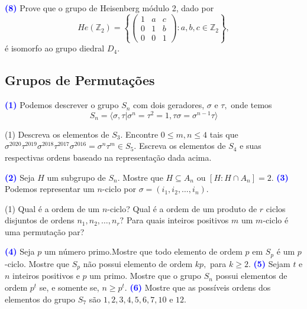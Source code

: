 \documentclass[12pt, a4paper]{article}
\newcommand{\negrito}[1]{\mbox{\boldmath{$#1$}}}
\begin{document}
\textcolor{blue}{\bf(8)} \label{ex5} Prove que o grupo de Heisenberg módulo 2, dado por
\[He(\mathbb{Z}_2) = \left\{ \left( \begin{array}{ccc} 1 & a & c \\ 0 & 1 & b \\ 0 & 0 & 1 \end{array} \right) : a,b,c \in \mathbb{Z}_2 \right\},\]
é isomorfo ao grupo diedral $D_4.$
\newpage
\subsection{\textcolor{Floresta}{Grupos de Permutações}}
\textcolor{blue}{\bf(1)}\label{64} Podemos descrever o grupo $S_n$ com dois geradores, $\sigma$ e $\tau,$ onde temos
\[
S_n = \langle \sigma, \tau |\sigma^n = \tau^2 = 1, \tau \sigma  = \sigma^{n-1} \tau \rangle
\]
\begin{tasks}[counter-format={(tsk[a])},label-width=3.6ex, label-format = {\bfseries}, column-sep = {0pt}](1)
\task[\textcolor{Floresta}{$\negrito{(a)} $}] Descreva os elementos de $S_3.$
\task[\textcolor{Floresta}{$\negrito{(b)} $}] Encontre $0 \le m, n \le 4$ tais que $\sigma^{2020}\tau^{2019}\sigma^{2018}\tau^{2017}\sigma^{2016} = \sigma^n \tau^m \in S_5.$
\task[\textcolor{Floresta}{$\negrito{(c)} $}] Escreva os elementos de $S_4$ e suas respectivas ordens baseado na representação dada acima.
\end{tasks}
\textcolor{blue}{\bf(2)}\label{65} Seja $H$ um subgrupo de $S_n.$ Mostre que $H \subseteq A_n$ ou $[H : H \cap A_n] = 2.$
\newline\newline
\textcolor{blue}{\bf(3)}\label{66} Podemos representar um $n$-ciclo por $\sigma = (i_1, i_2, \ldots, i_n).$
\begin{tasks}[counter-format={(tsk[a])},label-width=3.6ex, label-format = {\bfseries}, column-sep = {0pt}](1)
\task[\textcolor{Floresta}{$\negrito{(a)} $}] Qual é a ordem de um $n$-ciclo?
\task[\textcolor{Floresta}{$\negrito{(b)} $}] Qual é a ordem de um produto de $r$ ciclos disjuntos de ordens $n_1, n_2, \ldots, n_r?$
\task[\textcolor{Floresta}{$\negrito{(c)} $}] Para quais inteiros positivos $m$ um $m$-ciclo é uma permutação par?
\end{tasks}
\textcolor{blue}{\bf(4)}\label{67} Seja $p$ um número primo.Mostre que todo elemento de ordem $p$ em $S_p$ é um $p$-ciclo. Mostre que $S_p$ não possui elemento de ordem $kp,$ para $k \ge 2.$ 
\newline
\newline
\textcolor{blue}{\bf(5)}\label{68} Sejam $t$ e $n$ inteiros positivos e $p$ um primo. Mostre que o grupo $S_n$ possui elementos de ordem $p^t$ se, e somente se, $n \ge p^t.$
\newline\newline
\textcolor{blue}{\bf(6)}\label{69} Mostre que as possíveis ordens dos elementos do grupo $S_7$ são $1,2,3,4,5,6,7,10$ e $12.$
\end{document}
